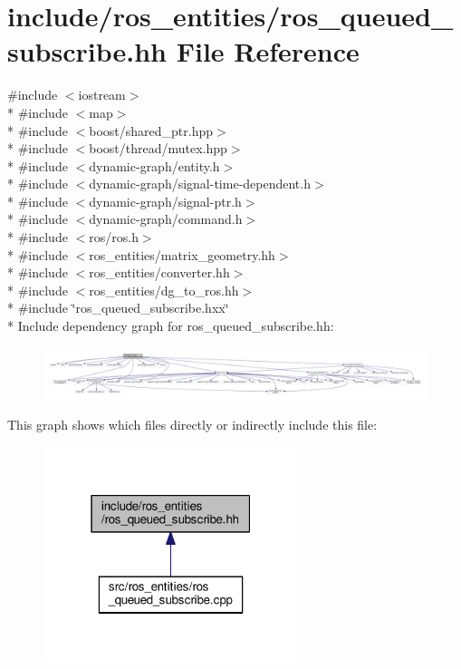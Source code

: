 \hypertarget{ros__queued__subscribe_8hh}{}\section{include/ros\+\_\+entities/ros\+\_\+queued\+\_\+subscribe.hh File Reference}
\label{ros__queued__subscribe_8hh}
{\ttfamily \#include $<$iostream$>$}\\*
{\ttfamily \#include $<$map$>$}\\*
{\ttfamily \#include $<$boost/shared\+\_\+ptr.\+hpp$>$}\\*
{\ttfamily \#include $<$boost/thread/mutex.\+hpp$>$}\\*
{\ttfamily \#include $<$dynamic-\/graph/entity.\+h$>$}\\*
{\ttfamily \#include $<$dynamic-\/graph/signal-\/time-\/dependent.\+h$>$}\\*
{\ttfamily \#include $<$dynamic-\/graph/signal-\/ptr.\+h$>$}\\*
{\ttfamily \#include $<$dynamic-\/graph/command.\+h$>$}\\*
{\ttfamily \#include $<$ros/ros.\+h$>$}\\*
{\ttfamily \#include $<$ros\+\_\+entities/matrix\+\_\+geometry.\+hh$>$}\\*
{\ttfamily \#include $<$ros\+\_\+entities/converter.\+hh$>$}\\*
{\ttfamily \#include $<$ros\+\_\+entities/dg\+\_\+to\+\_\+ros.\+hh$>$}\\*
{\ttfamily \#include \char`\"{}ros\+\_\+queued\+\_\+subscribe.\+hxx\char`\"{}}\\*
Include dependency graph for ros\+\_\+queued\+\_\+subscribe.\+hh\+:
\nopagebreak
\begin{figure}[H]
\begin{center}
\leavevmode
\includegraphics[width=350pt]{ros__queued__subscribe_8hh__incl}
\end{center}
\end{figure}
This graph shows which files directly or indirectly include this file\+:
\nopagebreak
\begin{figure}[H]
\begin{center}
\leavevmode
\includegraphics[width=211pt]{ros__queued__subscribe_8hh__dep__incl}
\end{center}
\end{figure}
